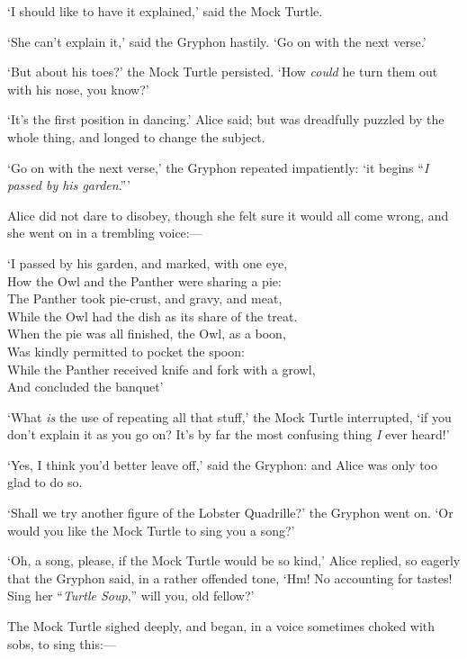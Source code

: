 \documentclass[12pt,openany]{memoir}
\renewenvironment{quote}%
  {\list{}{\leftmargin=2\parindent\rightmargin=0in}\item[]}%
  {\endlist}
\begin{document}
`I should like to have it explained,' said the Mock Turtle.

`She can't explain it,' said the Gryphon hastily. `Go on with the next verse.'

`But about his toes?' the Mock Turtle persisted. `How \textit{could} he turn them out with his nose, you know?'

`It's the first position in dancing.' Alice said; but was dreadfully puzzled by the whole thing, and longed to change the subject.

`Go on with the next verse,' the Gryphon repeated impatiently: `it begins ``\textit{I passed by his garden}.'''

Alice did not dare to disobey, though she felt sure it would all come wrong, and she went on in a trembling voice:---

\begin{quote}
`I passed by his garden, and marked, with one eye,\\
How the Owl and the Panther were sharing a pie:\\
The Panther took pie-crust, and gravy, and meat,\\
While the Owl had the dish as its share of the treat.\\
When the pie was all finished, the Owl, as a boon,\\
Was kindly permitted to pocket the spoon:\\
While the Panther received knife and fork with a growl,\\
And concluded the banquet'
\end{quote}

`What \textit{is} the use of repeating all that stuff,' the Mock Turtle interrupted, `if you don't explain it as you go on? It's by far the most confusing thing \textit{I} ever heard!'

`Yes, I think you'd better leave off,' said the Gryphon: and Alice was only too glad to do so.

`Shall we try another figure of the Lobster Quadrille?' the Gryphon went on. `Or would you like the Mock Turtle to sing you a song?'

`Oh, a song, please, if the Mock Turtle would be so kind,' Alice replied, so eagerly that the Gryphon said, in a rather offended tone, `Hm! No accounting for tastes! Sing her ``\textit{Turtle Soup},'' will you, old fellow?'

The Mock Turtle sighed deeply, and began, in a voice sometimes choked with sobs, to sing this:---
\end{document}
